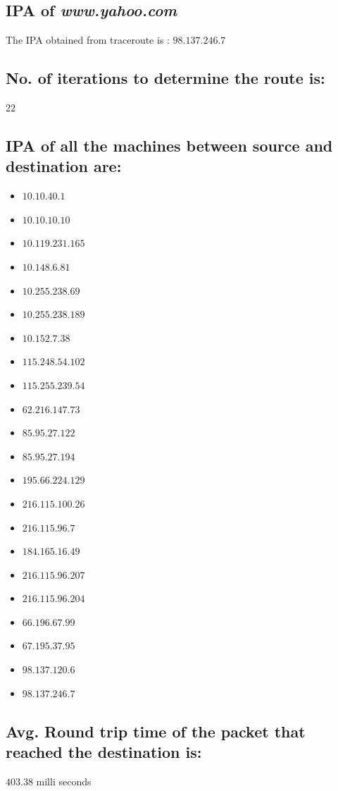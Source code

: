 \documentclass[]{report}
\begin{document}
\subsection{IPA of \textit{www.yahoo.com}}
The IPA obtained from traceroute is : \textbf{$98.137.246.7$}

\subsection{No. of iterations to determine the route is:} $22$

\subsection{IPA of all the machines between source and destination are: }
\begin{itemize}
	\item $10.10.40.1$
	\item $10.10.10.10$
	\item $10.119.231.165$
	\item $10.148.6.81$
	\item $10.255.238.69$
	\item $10.255.238.189$
	\item $10.152.7.38$
	\item $115.248.54.102$
	\item $115.255.239.54$
	\item $62.216.147.73$
	\item $85.95.27.122$
	\item $85.95.27.194$
	\item $195.66.224.129$
	\item $216.115.100.26$
	\item $216.115.96.7$
	\item $184.165.16.49$
	\item $216.115.96.207$
	\item $216.115.96.204$
	\item $66.196.67.99$
	\item $67.195.37.95$
	\item $98.137.120.6$
	\item $98.137.246.7$
\end{itemize}

\subsection{Avg. Round trip time of the packet that reached the destination is:}
$403.38$ milli seconds
\end{document}
